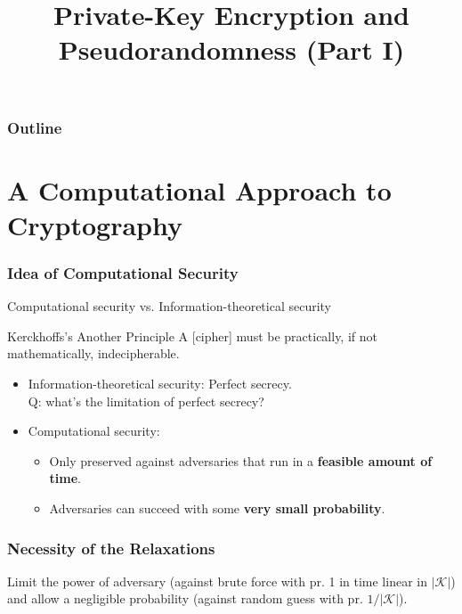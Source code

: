

\title{Private-Key Encryption and Pseudorandomness (Part I)}


\maketitle
\begin{frame}
\frametitle{Outline}
\tableofcontents
\end{frame}
\section{A Computational Approach to Cryptography}
\begin{frame}\frametitle{Idea of Computational Security}
Computational security vs. Information-theoretical security
\begin{alertblock}{Kerckhoffs's Another Principle}
A [cipher] must be practically, if not mathematically, indecipherable.
\end{alertblock}
\begin{itemize}
	\item Information-theoretical security: Perfect secrecy. \\
	\alert{Q: what's the limitation of perfect secrecy?}
	\item Computational security: 
\begin{itemize}
	\item Only preserved against adversaries that run in a \textbf{feasible amount of time}.
	\item Adversaries can succeed with some \textbf{very small probability}.
\end{itemize}
\end{itemize} 
\end{frame}
\begin{frame}\frametitle{Necessity of the Relaxations}
Limit the power of adversary (against brute force with pr. 1 in time linear in $|\mathcal{K}|$) and allow a negligible probability (against random guess with pr. $1/|\mathcal{K}|$).
\begin{figure}
\begin{center}

\end{center}
\end{figure}
\end{frame}
